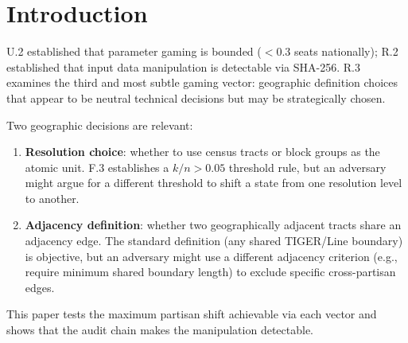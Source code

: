 \section{Introduction}

U.2 established that parameter gaming is bounded ($< 0.3$ seats nationally);
R.2 established that input data manipulation is detectable via SHA-256.
R.3 examines the third and most subtle gaming vector: geographic definition choices
that appear to be neutral technical decisions but may be strategically chosen.

Two geographic decisions are relevant:
\begin{enumerate}
  \item \textbf{Resolution choice}: whether to use census tracts or block groups
    as the atomic unit. F.3 establishes a $k/n > 0.05$ threshold rule, but
    an adversary might argue for a different threshold to shift a state from
    one resolution level to another.
  \item \textbf{Adjacency definition}: whether two geographically adjacent tracts
    share an adjacency edge. The standard definition (any shared TIGER/Line boundary)
    is objective, but an adversary might use a different adjacency criterion
    (e.g., require minimum shared boundary length) to exclude specific cross-partisan
    edges.
\end{enumerate}

This paper tests the maximum partisan shift achievable via each vector and shows
that the audit chain makes the manipulation detectable.

